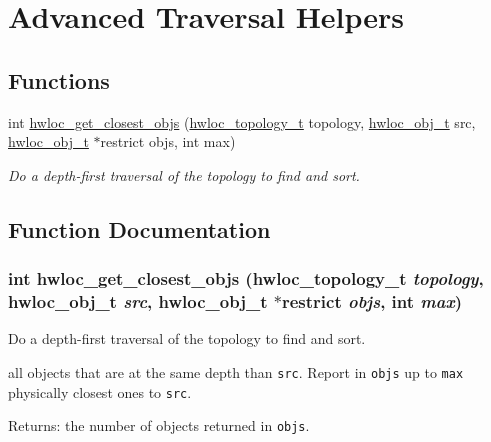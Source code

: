 \hypertarget{group__hwlocality__helper__traversal}{
\section{Advanced Traversal Helpers}
\label{group__hwlocality__helper__traversal}
}
\subsection*{Functions}
\begin{CompactItemize}
\item 
int \hyperlink{group__hwlocality__helper__traversal_gb761df678cab3699bd1a1d057e98bf1b}{hwloc\_\-get\_\-closest\_\-objs} (\hyperlink{group__hwlocality__topology_g9d1e76ee15a7dee158b786c30b6a6e38}{hwloc\_\-topology\_\-t} topology, \hyperlink{structhwloc__obj}{hwloc\_\-obj\_\-t} src, \hyperlink{structhwloc__obj}{hwloc\_\-obj\_\-t} $\ast$restrict objs, int max)
\begin{CompactList}\small\item\em Do a depth-first traversal of the topology to find and sort. \item\end{CompactList}\end{CompactItemize}


\subsection{Function Documentation}
\hypertarget{group__hwlocality__helper__traversal_gb761df678cab3699bd1a1d057e98bf1b}{
\subsubsection[{hwloc\_\-get\_\-closest\_\-objs}]{\setlength{\rightskip}{0pt plus 5cm}int hwloc\_\-get\_\-closest\_\-objs ({\bf hwloc\_\-topology\_\-t} {\em topology}, \/  {\bf hwloc\_\-obj\_\-t} {\em src}, \/  {\bf hwloc\_\-obj\_\-t} $\ast$restrict {\em objs}, \/  int {\em max})}}
\label{group__hwlocality__helper__traversal_gb761df678cab3699bd1a1d057e98bf1b}


Do a depth-first traversal of the topology to find and sort. 

all objects that are at the same depth than {\tt src}. Report in {\tt objs} up to {\tt max} physically closest ones to {\tt src}.

\begin{Desc}
\item[Returns:]the number of objects returned in {\tt objs}. \end{Desc}
